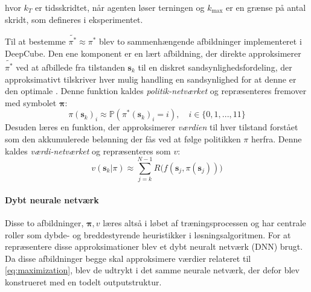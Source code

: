 \documentclass[../main.tex]{subfiles}
\begin{document}
hvor \(k_T\) er tidsskridtet, når agenten løser terningen og \(k_{\text{max}}\) er en grænse på antal skridt,  som defineres i eksperimentet. 

Til at bestemme \(\widetilde {\pi ^*} \approx 	\pi^*\) blev to sammenhængende afbildninger implementeret i DeepCube. Den ene komponent er en lært afbildning, der direkte approksimerer \(\widetilde {\pi ^*}\) ved at afbillede fra tilstanden \(\mathbf s_k\) til en diskret sandsynlighedsfordeling, der approksimativt tilskriver hver mulig handling en sandsynlighed for at denne er den optimale . Denne funktion kaldes \textit{politik-netværket} og repræsenteres fremover med symbolet \(\bm \pi\):
\[
\pi(\mathbf s_k)_i \approx \mathbb P (\pi^*(\mathbf s_k)_i = i ),\quad i \in \{0,1, ..., 11\}
\]
Desuden læres en funktion, der approksimerer \textit{værdien} til hver tilstand forstået som den akkumulerede belønning der fås ved at følge politikken \(\pi\) herfra. Denne kaldes \textit{værdi-netværket} og repræsenteres som \(v\):
\[
v(\mathbf s_k| \pi) \approx \sum_{j=k}^{N-1} R\big(f(\mathbf s_j,\pi(\mathbf s_j))\big)
\]
\paragraph{Dybt neurale netværk} Disse to afbildninger, \(\bm \pi, v\) læres altså i løbet af træningsprocessen og har centrale roller som dybde- og breddestyrende heuristikker i  løsningsalgoritmen. For at repræsentere disse approksimationer blev et dybt neuralt netværk (DNN) brugt. Da disse afbildninger begge skal approksimere værdier relateret til  \eqref{eq:maximization}, blev de udtrykt i det samme neurale netværk, der defor blev konstrueret med en todelt outputstruktur. 
\end{document}

